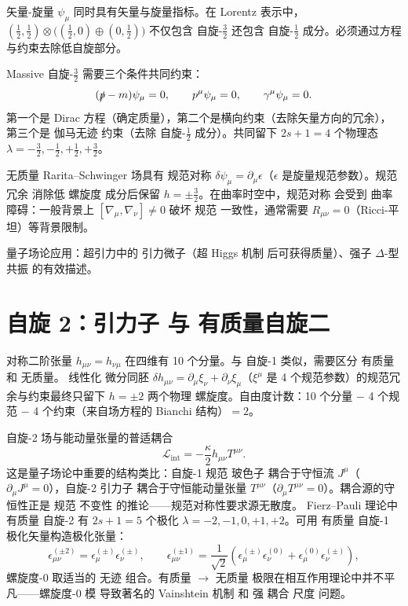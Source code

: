 矢量-旋量 $\psi_\mu$ 同时具有矢量与旋量指标。在 Lorentz 表示中，$(\frac{1}{2},\frac{1}{2})\otimes\big((\frac{1}{2},0)\oplus(0,\frac{1}{2})\big)$ 不仅包含 自旋-$\frac{3}{2}$ 还包含 自旋-$\frac{1}{2}$ 成分。必须通过方程与约束去除低自旋部分。

Massive 自旋-$\frac{3}{2}$ 需要三个条件共同约束：
\begin{equation}
(\slashed p-m)\psi_\mu=0,\qquad p^\mu\psi_\mu=0,\qquad \gamma^\mu\psi_\mu=0.
\end{equation}
第一个是 Dirac 方程（确定质量），第二个是横向约束（去除矢量方向的冗余），第三个是 伽马无迹 约束（去除 自旋-$\frac{1}{2}$ 成分）。共同留下 $2s+1=4$ 个物理态 $\lambda=-\frac{3}{2},-\frac{1}{2},+\frac{1}{2},+\frac{3}{2}$。

无质量 Rarita--Schwinger 场具有 规范对称 $\delta\psi_\mu=\partial_\mu\epsilon$（$\epsilon$ 是旋量规范参数）。规范 冗余 消除低 螺旋度 成分后保留 $h=\pm\frac{3}{2}$。在曲率时空中，规范对称 会受到 曲率 障碍：一般背景上 $[\nabla_\mu,\nabla_\nu]\neq0$ 破坏 规范 一致性，通常需要 $R_{\mu\nu}=0$（Ricci-平坦）等背景限制。

量子场论应用：超引力中的 引力微子（超 Higgs 机制 后可获得质量）、强子 $\Delta$-型 共振 的有效描述。

\section{自旋 2：引力子 与 有质量自旋二}

对称二阶张量 $h_{\mu\nu}=h_{\nu\mu}$ 在四维有 10 个分量。与 自旋-1 类似，需要区分 有质量 和 无质量。
线性化 微分同胚 $\delta h_{\mu\nu}=\partial_\mu\xi_\nu+\partial_\nu\xi_\mu$（$\xi^\mu$ 是 4 个规范参数）的规范冗余与约束最终只留下 $h=\pm2$ 两个物理 螺旋度。自由度计数：10 个分量 $-$ 4 个规范 $-$ 4 个约束（来自场方程的 Bianchi 结构）$=2$。

自旋-2 场与能动量张量的普适耦合
\begin{equation*}{\mathcal{L}_{\text{int}}=-\frac{\kappa}{2}h_{\mu\nu}T^{\mu\nu}.}
\end{equation*}
这是量子场论中重要的结构类比：自旋-1 规范 玻色子 耦合于守恒流 $J^\mu$（$\partial_\mu J^\mu=0$），自旋-2 引力子 耦合于守恒能动量张量 $T^{\mu\nu}$（$\partial_\mu T^{\mu\nu}=0$）。耦合源的守恒性正是 规范 不变性 的推论——规范对称性要求源无散度。
Fierz--Pauli 理论中 有质量 自旋-2 有 $2s+1=5$ 个极化 $\lambda=-2,-1,0,+1,+2$。可用 有质量 自旋-1 极化矢量构造极化张量：
\begin{equation}
\epsilon_{\mu\nu}^{(\pm 2)}=\epsilon_\mu^{(\pm)}\epsilon_\nu^{(\pm)},\qquad
\epsilon_{\mu\nu}^{(\pm 1)}=\frac{1}{\sqrt{2}}(\epsilon_\mu^{(\pm)}\epsilon_\nu^{(0)}+\epsilon_\mu^{(0)}\epsilon_\nu^{(\pm)}),
\end{equation}
螺旋度-0 取适当的 无迹 组合。有质量 $\to$ 无质量 极限在相互作用理论中并不平凡——螺旋度-0 模 导致著名的 Vainshtein 机制 和 强 耦合 尺度 问题。

